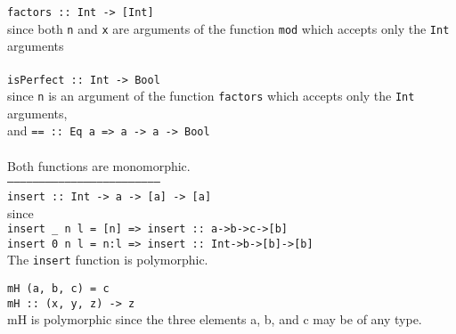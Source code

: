 \texttt{factors :: Int -> [Int]}\\
since both \texttt{n} and \texttt{x} are arguments of the function \texttt{mod} which accepts only the \texttt{Int} arguments\\
\\
\texttt{isPerfect :: Int -> Bool}\\
since \texttt{n} is an argument of the function \texttt{factors} which accepts only the \texttt{Int} arguments,\\
and \texttt{== :: Eq a => a -> a -> Bool}\\
\\
Both functions are monomorphic.\\
\texttt{-----------------------------------------------------------------------}\\
\texttt{insert :: Int -> a -> [a] -> [a]}\\
since\\
\texttt{insert \_ n l = [n] => insert :: a->b->c->[b]}\\
\texttt{insert 0 n l = n:l => insert :: Int->b->[b]->[b]}\\
The \texttt{insert} function is polymorphic.

\texttt{mH (a, b, c) = c} \\

\texttt{mH :: (x, y, z) -> z}\\
mH is polymorphic since the three elements a, b, and c may be of any type. \\